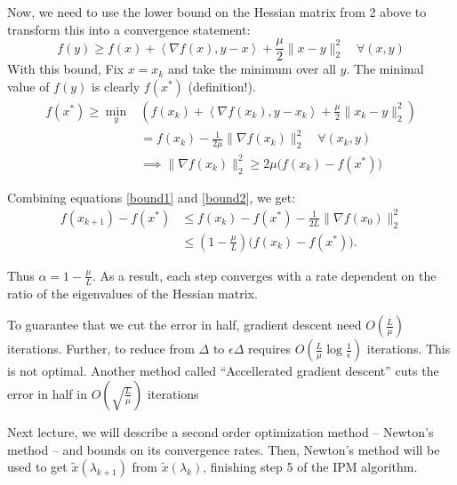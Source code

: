 \documentclass[11pt]{article}
\newcommand{\inprod}[1]{\left\langle #1 \right\rangle}
\begin{document}
Now, we need to use the lower bound on the Hessian matrix from 2 above to transform this into a convergence statement:
\begin{equation}
    f(y) \geq f(x) + \inprod{\nabla f(x), y-x} + \frac{\mu}{2} \|x-y\|^2_2 \quad \forall (x,y)
\end{equation}
With this bound, Fix $x = x_k$ and take the minimum over all $y$. The minimal value of $f(y)$ is clearly $f(x^*)$ (definition!).
\begin{align}
    f(x^*) \geq \min_y& \left(f(x_k) + \inprod{\nabla f(x_k), y-x_k} + \frac{\mu}{2} \|x_k-y\|^2_2\right) \\
    & = f(x_k) - \frac{1}{2\mu} \|\nabla f(x_k)\|^2_2 \quad \forall (x_k,y) \\ 
    &\implies \|\nabla f(x_k)\|_2^2 \geq 2\mu \big(f(x_k) - f(x^*)\big)
    \label{bound2}
\end{align}

Combining equations \ref{bound1} and \ref{bound2}, we get:
\begin{align}
f(x_{k+1}) - f(x^*) &\leq f(x_k) - f(x^*) - \frac{1}{2L}\|\nabla f(x_0)\|^2_2 \\
                    & \leq \left(1 - \frac{\mu}{L}\right) \big(f(x_k) - f(x^*)\big). 
\end{align}

Thus $\alpha  = 1 - \frac{\mu}{L}$. As a result, each step converges with a rate dependent on the ratio of the eigenvalues of the Hessian matrix.

To guarantee that we cut the error in half, gradient descent need $O\left(\frac{L}{\mu}\right)$ iterations. Further, to reduce from $\Delta$ to $\epsilon \Delta$ requires $O\left(\frac{L}{\mu}\log\frac{1}{\epsilon}\right)$ iterations. This is not optimal. Another method called ``Accellerated gradient descent'' cuts the error in half in $O\left(\sqrt{\frac{L}{\mu}}\right)$ iterations \cite{Nesterov83}

Next lecture, we will describe a second order optimization method -- Newton's method -- and bounds on its convergence rates. Then, Newton's method will be used to get $\tilde{x}(\lambda_{k+1})$ from $\tilde{x}(\lambda_k)$, finishing step 5 of the IPM algorithm.
\end{document}
